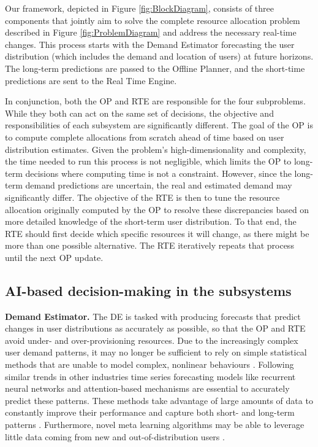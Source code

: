 \documentclass[letterpaper]{article} %
\begin{document}
Our framework, depicted in Figure \ref{fig:BlockDiagram}, consists of three components that jointly aim to solve the complete resource allocation problem described in Figure \ref{fig:ProblemDiagram} and address the necessary real-time changes. This process starts with the Demand Estimator forecasting the user distribution (which includes the demand and location of users) at future horizons. The long-term predictions are passed to the Offline Planner, and the short-time predictions are sent to the Real Time Engine.


In conjunction, both the OP and RTE are responsible for the four subproblems. While they both can act on the same set of decisions, the objective and responsibilities of each subsystem are significantly different. The goal of the OP is to compute complete allocations from scratch ahead of time based on user distribution estimates. Given the problem's high-dimensionality and complexity, the time needed to run this process is not negligible, which limits the OP to long-term decisions where computing time is not a constraint. However, since the long-term demand predictions are uncertain, the real and estimated demand may significantly differ. The objective of the RTE is then to tune the resource allocation originally computed by the OP to resolve these discrepancies based on more detailed knowledge of the short-term user distribution. To that end, the RTE should first decide which specific resources it will change, as there might be more than one possible alternative. The RTE iteratively repeats that process until the next OP update.


\subsection{AI-based decision-making in the subsystems}

\textbf{Demand Estimator.} The DE is tasked with producing forecasts that predict changes in user distributions as accurately as possible, so that the OP and RTE avoid under- and over-provisioning resources. Due to the increasingly complex user demand patterns, it may no longer be sufficient to rely on simple statistical methods that are unable to model complex, nonlinear behaviours \cite{Suganthi2012}. Following similar trends in other industries \cite{Fildes2002, Zhao2012, Wang2017, Panapakidis2016, Sagheer2019} time series forecasting models like recurrent neural networks and attention-based mechanisms \cite{Vaswani2017} are essential to accurately predict these patterns. These methods take advantage of large amounts of data to constantly improve their performance and capture both short- and long-term patterns \cite{Vaswani2017}. Furthermore, novel meta learning algorithms may be able to leverage little data coming from new and out-of-distribution users \cite{Panigrahi2021}.
\end{document}
